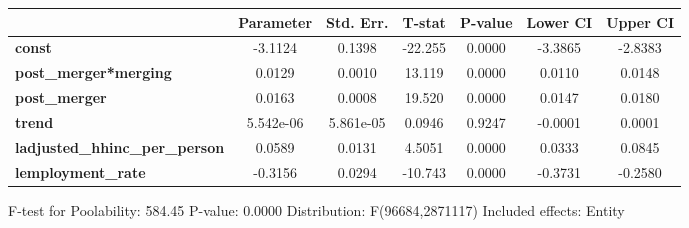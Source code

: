 \documentclass{report}
\begin{document}
\begin{center}
\begin{tabular}{lclc}
\bottomrule
\end{tabular}
\begin{tabular}{lcccccc}
                                       & \textbf{Parameter} & \textbf{Std. Err.} & \textbf{T-stat} & \textbf{P-value} & \textbf{Lower CI} & \textbf{Upper CI}  \\
\midrule
\textbf{const}                         &      -3.1124       &       0.1398       &     -22.255     &      0.0000      &      -3.3865      &      -2.8383       \\
\textbf{post\_merger*merging}          &       0.0129       &       0.0010       &      13.119     &      0.0000      &       0.0110      &       0.0148       \\
\textbf{post\_merger}                  &       0.0163       &       0.0008       &      19.520     &      0.0000      &       0.0147      &       0.0180       \\
\textbf{trend}                         &     5.542e-06      &     5.861e-05      &      0.0946     &      0.9247      &      -0.0001      &       0.0001       \\
\textbf{ladjusted\_hhinc\_per\_person} &       0.0589       &       0.0131       &      4.5051     &      0.0000      &       0.0333      &       0.0845       \\
\textbf{lemployment\_rate}             &      -0.3156       &       0.0294       &     -10.743     &      0.0000      &      -0.3731      &      -0.2580       \\
\bottomrule
\end{tabular}
\end{center}

F-test for Poolability: 584.45 \newline
 P-value: 0.0000 \newline
 Distribution: F(96684,2871117) \newline
  \newline
 Included effects: Entity
\end{document}
